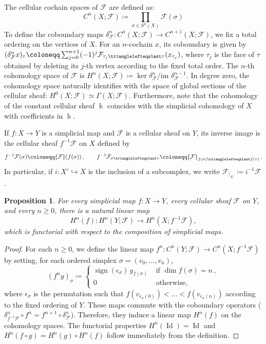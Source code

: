 \documentclass[reqno,12pt]{amsart}
\newcommand{\face}{{\trianglelefteqslant}}
\newcommand{\cF}{{\mathcal F}}
\DeclareMathOperator{\Id}{{Id}}
\DeclareMathOperator{\sign}{sign}
\newcommand{\0}{\mathbf 0}
\newtheorem{proposition}[theorem]{Proposition}
\theoremstyle{definition}
\begin{document}
The cellular cochain spaces of $\mathcal{F}$ are defined as:
\[
C^n(X;\mathcal{F}) \coloneqq \prod_{\sigma\in S^n(X)}\mathcal{F}(\sigma)
\]
To define the coboundary maps $\delta^n_\mathcal{F}\colon C^n(X;\mathcal{F})\to C^{n+1}(X;\mathcal{F})$, we fix a total ordering on the vertices of $X$. For an $n$-cochain $x$, its coboundary is given by $(\delta^n_\mathcal{F} x)_\tau \coloneqq \sum_{j=0}^{n+1} (-1)^j \mathcal{F}_{\tau_j\face\tau}(x_{\tau_j})$,
where $\tau_j$ is the face of $\tau$ obtained by deleting its $j$-th vertex according to the fixed total order. The $n$-th cohomology space of $\mathcal{F}$ is $H^n(X;\mathcal{F}) \coloneqq \ker\delta^n_\mathcal{F}/\text{im }\delta^{n-1}_\mathcal{F}$. In degree zero, the cohomology space naturally identifies with the space of global sections of the cellular sheaf: $H^0(X;\mathcal{F})\simeq \Gamma(X;\mathcal{F})$. Furthermore, note that the cohomology of the constant cellular sheaf $\Bbbk$ coincides with the simplicial cohomology of $X$ with coefficients in $\Bbbk$.


If $f\colon X\to Y$ is a simplicial map and $\cF$ is a cellular sheaf on $Y$, its inverse image is the cellular sheaf $f^{-1}\cF$ on $X$ defined by
\[
f^{-1}\cF(\sigma)\coloneqq \cF(f(\sigma))\,,\qquad 
     f^{-1}\cF_{\sigma\face \tau}\coloneqq \cF_{f(\sigma)\face f(\tau)}\,.
\]
In particular, if $i\colon X'\hookrightarrow X$ is the inclusion of a subcomplex, we write $\cF_{|_{X'}}\coloneqq i^{-1}\cF$.

\begin{proposition}\label{Prop:FunctCellSheafCohomology}
For every simplicial map $f\colon X\to Y$, every cellular sheaf $\cF$ on $Y$, and every $n\geq 0$, there is a natural linear map
\[
    H^n(f)\colon H^n(Y;\cF)\longrightarrow H^n(X;f^{-1}\cF),
\]
which is functorial with respect to the composition of simplicial maps.
\end{proposition}
\begin{proof}
For each $n \ge 0$, we define the linear map $f^n \colon C^n(Y;\cF) \to C^n(X;f^{-1}\cF)$ by setting, for each ordered simplex $\sigma=(v_0,\dots,v_n)$, 
\[
    (f^ny)_\sigma\coloneqq \begin{cases}
        \sign(\epsilon_\sigma)\,y_{f(\sigma)} & \text{ if } \dim f(\sigma)=n\,,\\
        0 & \text{ otherwise,}
    \end{cases}
    \]
    where $\epsilon_\sigma$ is the permutation such that $f(v_{\epsilon_\sigma(0)}) < \dots < f(v_{\epsilon_\sigma(n)})$ according to the fixed ordering of $Y$. These maps commute with the coboundary operators ($\delta^n_{f^{-1}\cF} \circ f^n = f^{n+1} \circ \delta^n_\cF$). Therefore, they induce a linear map $H^n(f)$ on the cohomology spaces. The functorial properties $H^n(\Id) = \Id$ and $H^n(f \circ g) = H^n(g) \circ H^n(f)$ follow immediately from the definition.
\end{proof}
\end{document}
